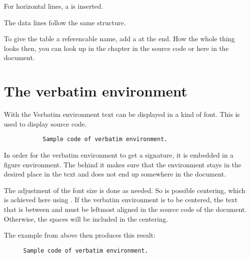 For horizontal lines, a  is inserted.
\bigbreak

The data lines follow the same structure.
\bigbreak

To give the table a referencable name, add a
 at the end. How
the whole thing looks then, you can look up in the chapter
 in the source code or here in the document.

\section{The verbatim environment}

With the Verbatim environment text can be displayed in a kind of
 font. This is used to display source code.

\begin{figure}[H]
    \centering
    \begin{verbbox}
        \begin{figure}[H]
            \small
            \centering
            \begin{BVerbatim}
Sample code of verbatim environment.
            \end{BVerbatim}
        \end{figure}
    \end{verbbox}
    \theverbbox
\end{figure}

In order for the verbatim environment to get a signature, it is embedded in a
figure environment. The \tsFontCode{[H]} behind it makes sure that the
environment stays in the desired place in the text and does not end up
somewhere in the document.
\bigbreak

The adjustment of the font size is done as needed. So is possible centering,
which is achieved here using .
 If the verbatim environment is to be centered, the text that
is between  and
 must be leftmost aligned in the
source code of the document. Otherwise, the spaces will be included in the
centering.
\bigbreak

The example from above then produces this result:

\begin{figure}[H]
    \small
    \centering
    \begin{BVerbatim}
Sample code of verbatim environment.
    \end{BVerbatim}
\end{figure}
